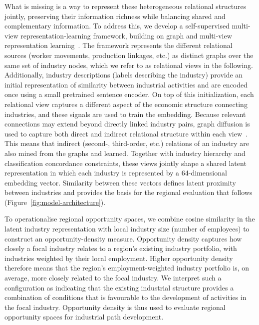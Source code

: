 \documentclass[9pt,twocolumn,twoside]{pnas-new}
\begin{document}
What is missing is a way to represent these heterogeneous relational structures jointly, preserving their information richness while balancing shared and complementary information. To address this, we develop a self-supervised multi-view representation-learning framework, building on graph and multi-view representation learning~\cite{hamiltonRepresentationLearningGraphs2017,parkRelationalKnowledgeDistillation2019,dongMetapath2vecScalableRepresentation2017,shiMvn2vecPreservationCollaboration2018,schlichtkrullModelingRelationalData2018}. The framework represents the different relational sources (worker movements, production linkages, etc.) as distinct graphs over the same set of industry nodes, which we refer to as relational views in the following. Additionally, industry descriptions (labels describing the industry) provide an initial representation of similarity between industrial activities and are encoded once using a small pretrained sentence encoder. On top of this initialization, each relational view captures a different aspect of the economic structure connecting industries, and these signals are used to train the embedding. Because relevant connections may extend beyond directly linked industry pairs, graph diffusion is used to capture both direct and indirect relational structure within each view~\cite{coifmanDiffusionMaps2006,gasteigerDiffusionImprovesGraph2019,bertagnolliDiffusionGeometryMultiplex2021,zhangGraphDiffusionEnhanced2026}. This means that indirect (second-, third-order, etc.) relations of an industry are also mined from the graphs and learned. Together with industry hierarchy and classification concordance constraints, these views jointly shape a shared latent representation in which each industry is represented by a 64-dimensional embedding vector. Similarity between these vectors defines latent proximity between industries and provides the basis for the regional evaluation that follows (Figure~\ref{fig:model-architecture}).

To operationalise regional opportunity spaces, we combine cosine similarity in the latent industry representation with local industry size (number of employees) to construct an opportunity-density measure. Opportunity density captures how closely a focal industry relates to a region's existing industry portfolio, with industries weighted by their local employment. Higher opportunity density therefore means that the region's employment-weighted industry portfolio is, on average, more closely related to the focal industry. We interpret such a configuration as indicating that the existing industrial structure provides a combination of conditions that is favourable to the development of activities in the focal industry. Opportunity density is thus used to evaluate regional opportunity spaces for industrial path development.
\end{document}
